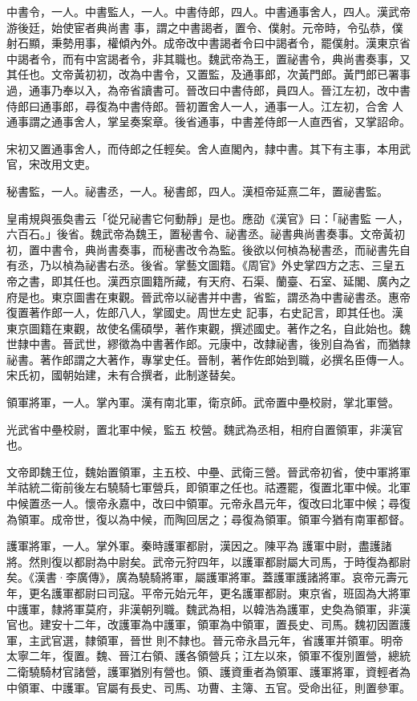 \begin{pinyinscope}
 中書令，一人。中書監人，一人。中書侍郎，四人。中書通事舍人，四人。漢武帝游後廷，始使宦者典尚書
 事，謂之中書謁者，置令、僕射。元帝時，令弘恭，僕射石顯，秉勢用事，權傾內外。成帝改中書謁者令曰中謁者令，罷僕射。漢東京省中謁者令，而有中宮謁者令，非其職也。魏武帝為王，置祕書令，典尚書奏事，又其任也。文帝黃初初，改為中書令，又置監，及通事郎，次黃門郎。黃門郎已署事過，通事乃奉以入，為帝省讀書可。晉改曰中書侍郎，員四人。晉江左初，改中書侍郎曰通事郎，尋復為中書侍郎。晉初置舍人一人，通事一人。江左初，合舍
 人通事謂之通事舍人，掌呈奏案章。後省通事，中書差侍郎一人直西省，又掌詔命。



 宋初又置通事舍人，而侍郎之任輕矣。舍人直閣內，隸中書。其下有主事，本用武官，宋改用文吏。



 秘書監，一人。祕書丞，一人。秘書郎，四人。漢桓帝延熹二年，置祕書監。



 皇甫規與張奐書云「從兄祕書它何動靜」是也。應劭《漢官》曰：「祕書監
 一人，六百石。」後省。魏武帝為魏王，置秘書令、祕書丞。祕書典尚書奏事。文帝黃初初，置中書令，典尚書奏事，而秘書改令為監。後欲以何楨為秘書丞，而祕書先自有丞，乃以楨為祕書右丞。後省。掌藝文圖籍。《周官》外史掌四方之志、三皇五帝之書，即其任也。漢西京圖籍所藏，有天府、石渠、蘭臺、石室、延閣、廣內之府是也。東京圖書在東觀。晉武帝以祕書并中書，省監，謂丞為中書祕書丞。惠帝復置著作郎一人，佐郎八人，掌國史。周世左史
 記事，右史記言，即其任也。漢東京圖籍在東觀，故使名儒碩學，著作東觀，撰述國史。著作之名，自此始也。魏世隸中書。晉武世，繆徵為中書著作郎。元康中，改隸祕書，後別自為省，而猶隸祕書。著作郎謂之大著作，專掌史任。晉制，著作佐郎始到職，必撰名臣傳一人。宋氏初，國朝始建，未有合撰者，此制遂替矣。



 領軍將軍，一人。掌內軍。漢有南北軍，衛京師。武帝置中壘校尉，掌北軍營。



 光武省中壘校尉，置北軍中候，監五
 校營。魏武為丞相，相府自置領軍，非漢官也。



 文帝即魏王位，魏始置領軍，主五校、中壘、武衛三營。晉武帝初省，使中軍將軍羊祜統二衛前後左右驍騎七軍營兵，即領軍之任也。祜遷罷，復置北軍中候。北軍中候置丞一人。懷帝永嘉中，改曰中領軍。元帝永昌元年，復改曰北軍中候；尋復為領軍。成帝世，復以為中候，而陶回居之；尋復為領軍。領軍今猶有南軍都督。



 護軍將軍，一人。掌外軍。秦時護軍都尉，漢因之。陳平為
 護軍中尉，盡護諸將。然則復以都尉為中尉矣。武帝元狩四年，以護軍都尉屬大司馬，于時復為都尉矣。《漢書·李廣傳》，廣為驍騎將軍，屬護軍將軍。蓋護軍護諸將軍。哀帝元壽元年，更名護軍都尉曰司寇。平帝元始元年，更名護軍都尉。東京省，班固為大將軍中護軍，隸將軍莫府，非漢朝列職。魏武為相，以韓浩為護軍，史奐為領軍，非漢官也。建安十二年，改護軍為中護軍，領軍為中領軍，置長史、司馬。魏初因置護軍，主武官選，隸領軍，晉世
 則不隸也。晉元帝永昌元年，省護軍并領軍。明帝太寧二年，復置。魏、晉江右領、護各領營兵；江左以來，領軍不復別置營，總統二衛驍騎材官諸營，護軍猶別有營也。領、護資重者為領軍、護軍將軍，資輕者為中領軍、中護軍。官屬有長史、司馬、功曹、主簿、五官。受命出征，則置參軍。




\end{pinyinscope}
